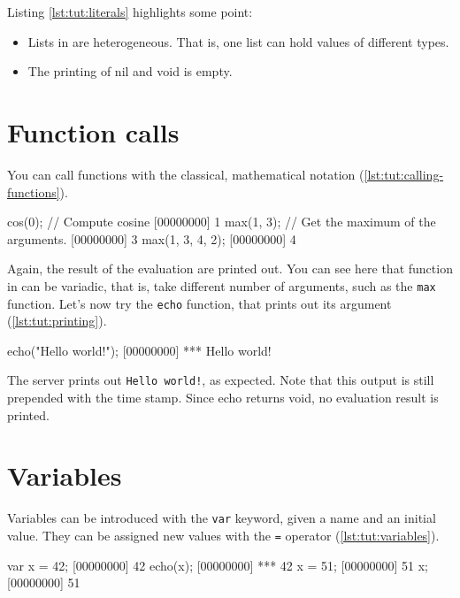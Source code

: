 Listing \ref{lst:tut:literals} highlights some point:
\begin{itemize}
\item Lists in \us are heterogeneous. That is, one list can hold
  values of different types.
\item The printing of nil and void is empty.
\end{itemize}

\section{Function calls}

You can call functions with the classical, mathematical notation
(\autoref{lst:tut:calling-functions}).

\begin{urbiscript}[caption=Calling functions,label=lst:tut:calling-functions]
cos(0); // Compute cosine
[00000000] 1
max(1, 3); // Get the maximum of the arguments.
[00000000] 3
max(1, 3, 4, 2);
[00000000] 4
\end{urbiscript}

Again, the result of the evaluation are printed out. You can see here
that function in \us can be variadic, that is, take different number
of arguments, such as the \lstinline{max} function. Let's now try the
\lstinline{echo} function, that prints out its argument
(\autoref{lst:tut:printing}).

\begin{urbiscript}[caption=Printing out,label=lst:tut:printing]
echo("Hello world!");
[00000000] *** Hello world!
\end{urbiscript}

The server prints out \lstinline{Hello world!}, as expected. Note that
this output is still prepended with the time stamp. Since echo returns
void, no evaluation result is printed.

\section{Variables}
Variables can be introduced with the \lstinline{var} keyword, given a
name and an initial value. They can be assigned new values with the
\lstinline{=} operator (\autoref{lst:tut:variables}).

\begin{urbiscript}[caption=Using variables,label=lst:tut:variables]
var x = 42;
[00000000] 42
echo(x);
[00000000] *** 42
x = 51;
[00000000] 51
x;
[00000000] 51
\end{urbiscript}

